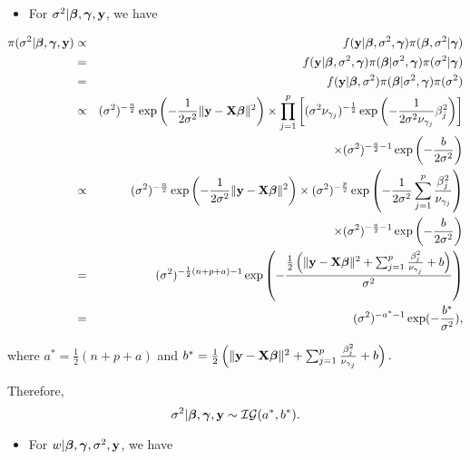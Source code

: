 \documentclass[]{book}
\providecommand{\tightlist}{%
  \setlength{\itemsep}{0pt}\setlength{\parskip}{0pt}}
\begin{document}
\begin{itemize}
\tightlist
\item
  For \(\sigma^2|{\boldsymbol \beta}, {\boldsymbol \gamma}, {\bf y}\), we have
\end{itemize}

\begin{eqnarray*}
\pi(\sigma^2|{\boldsymbol \beta}, {\boldsymbol \gamma}, {\bf y})&\propto&f({\bf y}|{\boldsymbol \beta},\sigma^2,{\boldsymbol \gamma})\pi({\boldsymbol \beta},\sigma^2|{\boldsymbol \gamma})\\
&=&f({\bf y}|{\boldsymbol \beta}, \sigma^2, {\boldsymbol \gamma})\pi({\boldsymbol \beta}|\sigma^2,{\boldsymbol \gamma})\pi(\sigma^2|{\boldsymbol \gamma})\\
&=&f({\bf y}|{\boldsymbol \beta}, \sigma^2)\pi({\boldsymbol \beta}|\sigma^2,{\boldsymbol \gamma})\pi(\sigma^2)\\
&\propto&(\sigma^2)^{-\frac{n}{2}}\exp\left(-\frac{1}{2\sigma^2}\|{\bf y}-{\bf X}{\boldsymbol \beta}\|^2\right)\times
\prod_{j=1}^{p}\left[(\sigma^2\nu_{\gamma_j})^{-\frac{1}{2}}\exp\left(-\frac{1}{2\sigma^2\nu_{\gamma_j}}
\beta_j^2\right)\right]\\
&&\times(\sigma^2)^{-\frac{a}{2}-1}\exp\left(-\frac{b}{2\sigma^2}\right)\\
&\propto&(\sigma^2)^{-\frac{n}{2}}\exp\left(-\frac{1}{2\sigma^2}\|{\bf y}-{\bf X}{\boldsymbol \beta}\|^2\right)\times
(\sigma^2)^{-\frac{p}{2}}\exp\left(-\frac{1}{2\sigma^2}\sum_{j=1}^{p}\frac{\beta_j^2}{\nu_{\gamma_j}}\right)\\
&&\times(\sigma^2)^{-\frac{a}{2}-1}\exp\left(-\frac{b}{2\sigma^2}\right)\\
&=& (\sigma^2)^{-\frac{1}{2}(n+p+a)-1}\exp\left(-\frac{\frac{1}{2}\left(\|{\bf y}-{\bf X}{\boldsymbol \beta}
\|^2 + \sum_{j=1}^{p}\frac{\beta_j^2}{\nu_{\gamma_j}} + b\right)}{\sigma^2}\right)\\
&=&(\sigma^2)^{-a^* -1}\exp(-\frac{b^*}{\sigma^2}),
\end{eqnarray*}

where \(a^*=\frac{1}{2}(n+p+a)\) and \(b^* = \frac{1}{2}\left(\|{\bf y}-{\bf X}{\boldsymbol \beta}\|^2 + \sum_{j=1}^{p}\frac{\beta_j^2}{\nu_{\gamma_j}} + b\right).\)

Therefore,
\[\sigma^2|{\boldsymbol \beta}, {\boldsymbol \gamma}, {\bf y}\sim \mathcal{IG}(a^*,b^*).\]

\begin{itemize}
\tightlist
\item
  For \(w|{\boldsymbol \beta},{\boldsymbol \gamma},\sigma^2,{\bf y}\), we have
\end{itemize}
\end{document}
